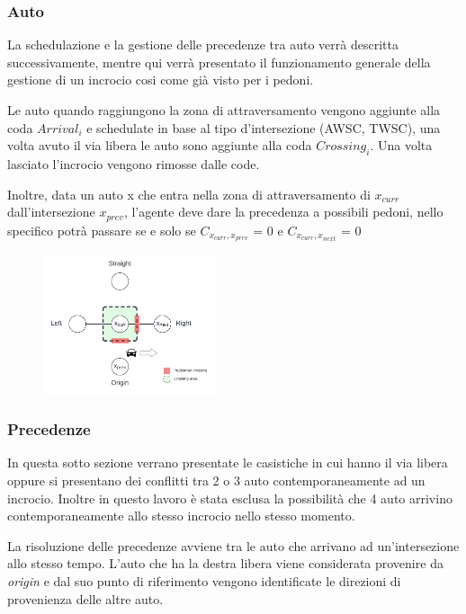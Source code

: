 \subsubsection*{Auto}

La schedulazione e la gestione delle precedenze tra auto verrà descritta successivamente,
mentre qui verrà presentato il funzionamento generale della gestione di un incrocio cosi come già visto per i pedoni.

Le auto quando raggiungono la zona di attraversamento vengono aggiunte alla coda $\textit{Arrival}_i$ e schedulate
in base al tipo d'intersezione (AWSC, TWSC), una volta avuto il via libera le auto sono aggiunte alla coda $\textit{Crossing}_i$.
%
Una volta lasciato l'incrocio vengono rimosse dalle code.

Inoltre, data un auto x che entra nella zona di attraversamento di $x_{curr}$ dall'intersezione $x_{prev}$,
l'agente deve dare la precedenza a possibili pedoni, nello specifico potrà passare se e solo se $C_{x_{curr},x_{prev}}$ = 0 e $C_{x_{curr},x_{next}}$ = 0
\begin{figure}[ht]
    \centering
    \includegraphics[width=0.45\textwidth]{images/crossing_auto_ped_crossing}
\end{figure}


\newpage



\subsubsection*{Precedenze}
In questa sotto sezione verrano presentate le casistiche in cui hanno il via libera oppure si presentano dei conflitti tra 2 o 3 auto contemporaneamente ad un incrocio.
Inoltre in questo lavoro è stata esclusa la possibilità che 4 auto arrivino contemporaneamente allo stesso incrocio nello stesso momento.

La risoluzione delle precedenze avviene tra le auto che arrivano ad un'intersezione allo stesso tempo. 
L'auto che ha la destra libera viene considerata provenire da \textit{origin} e dal suo punto di riferimento
vengono identificate le direzioni di provenienza delle altre auto. 

